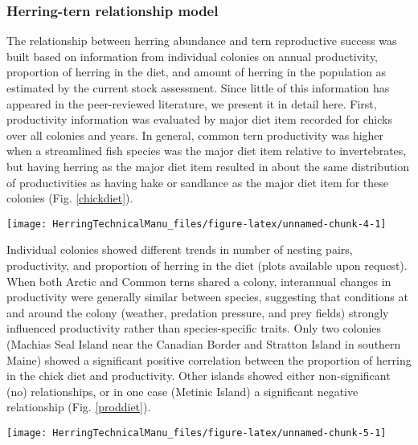 \documentclass[]{article}
\let\origfigure\figure
\let\endorigfigure\endfigure
\renewenvironment{figure}[1][2] {
    \expandafter\origfigure\expandafter[H]
} {
    \endorigfigure
}
\begin{document}
\subsubsection{Herring-tern relationship
model}\label{herring-tern-relationship-model}

The relationship between herring abundance and tern reproductive success
was built based on information from individual colonies on annual
productivity, proportion of herring in the diet, and amount of herring
in the population as estimated by the current stock assessment. Since
little of this information has appeared in the peer-reviewed literature,
we present it in detail here. First, productivity information was
evaluated by major diet item recorded for chicks over all colonies and
years. In general, common tern productivity was higher when a
streamlined fish species was the major diet item relative to
invertebrates, but having herring as the major diet item resulted in
about the same distribution of productivities as having hake or
sandlance as the major diet item for these colonies (Fig.
\ref{chickdiet}).

\begin{figure}

{\centering \texttt{[image: HerringTechnicalManu\_files/figure-latex/unnamed-chunk-4-1]} 

}

\caption{Major diet items for Gulf of Maine tern fledgelings \label{chickdiet}}\label{fig:unnamed-chunk-4}
\end{figure}

Individual colonies showed different trends in number of nesting pairs,
productivity, and proportion of herring in the diet (plots available
upon request). When both Arctic and Common terns shared a colony,
interannual changes in productivity were generally similar between
species, suggesting that conditions at and around the colony (weather,
predation pressure, and prey fields) strongly influenced productivity
rather than species-specific traits. Only two colonies (Machias Seal
Island near the Canadian Border and Stratton Island in southern Maine)
showed a significant positive correlation between the proportion of
herring in the chick diet and productivity. Other islands showed either
non-significant (no) relationships, or in one case (Metinic Island) a
significant negative relationship (Fig. \ref{proddiet}).

\begin{figure}

{\centering \texttt{[image: HerringTechnicalManu\_files/figure-latex/unnamed-chunk-5-1]} 

}

\caption{Herring proporiton in diet and tern productivity by colony \label{proddiet}}\label{fig:unnamed-chunk-5}
\end{figure}
\end{document}

